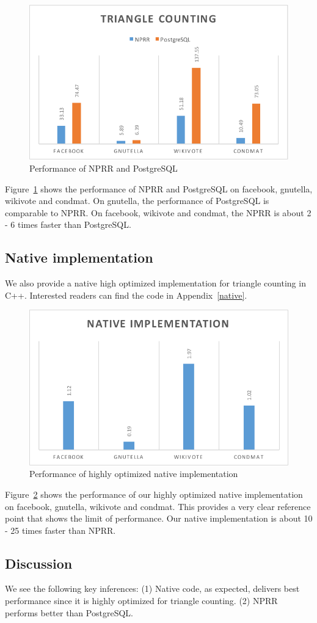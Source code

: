 \begin{figure}[!h]
    \centering
    \includegraphics[width=0.8\columnwidth]{perf.pdf}
    \caption{Performance of NPRR and PostgreSQL}
    \label{perf}
\end{figure}

Figure~\ref{perf} shows the performance of NPRR and PostgreSQL on facebook, gnutella, wikivote and condmat. On gnutella, the performance of PostgreSQL is comparable to NPRR. On facebook, wikivote and condmat, the NPRR is about 2 - 6 times faster than PostgreSQL. 


\subsection{Native implementation}

We also provide a native high optimized implementation for triangle counting in C++. Interested readers can find the code in Appendix~\ref{native}.

\begin{figure}[!h]
    \centering
    \includegraphics[width=0.8\columnwidth]{nativeperf.pdf}
    \caption{Performance of highly optimized native implementation}
    \label{nativeperf}
\end{figure}


Figure~\ref{nativeperf} shows the performance of our highly optimized native implementation on facebook, gnutella, wikivote and condmat. This provides a very clear reference point that shows the limit of performance. Our native implementation is about 10 - 25 times faster than NPRR. 
\subsection{Discussion}

We see the following key inferences: (1) Native code, as expected, delivers best performance since it is highly optimized for triangle counting. (2) NPRR performs better than PostgreSQL.
